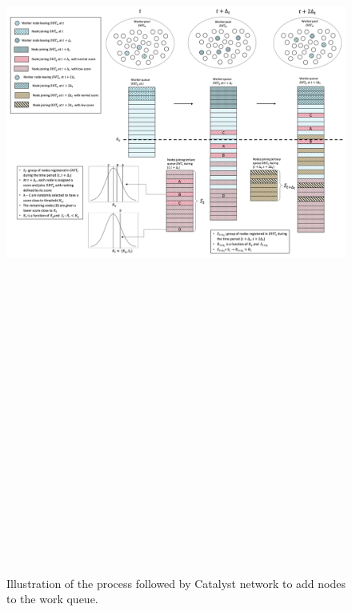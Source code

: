 \newpage
\begin{landscape}
\begin{figure}
\centering
\includegraphics[width=22cm,height=42cm,keepaspectratio]{Figures/Work_Queue_Management}
\caption{\label{fig:NSM}Illustration of the process followed by Catalyst network to add nodes to the work queue.}
\end{figure}
\end{landscape}

